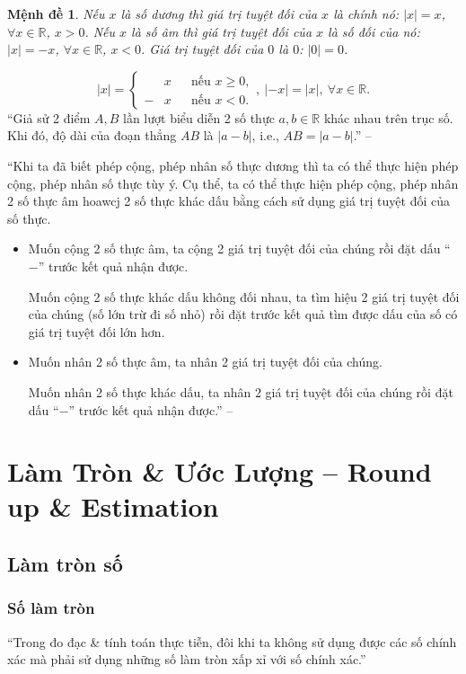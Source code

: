 \documentclass[oneside]{book}
\numberwithin{equation}{section}
\newtheorem{menhde}{Mệnh đề}[section]
\begin{document}
\begin{menhde}
	Nếu $x$ là số dương thì giá trị tuyệt đối của $x$ là chính nó: $|x| = x$, $\forall x\in\mathbb{R}$, $x > 0$. Nếu $x$ là số âm thì giá trị tuyệt đối của $x$ là số đối của nó: $|x| = -x$, $\forall x\in\mathbb{R}$, $x < 0$. Giá trị tuyệt đối của $0$ là $0$: $|0| = 0$.
\end{menhde}
\begin{equation*}
	|x| = \left\{\begin{split}
		&x&&\mbox{nếu } x\ge 0,\\
		-&x&&\mbox{nếu } x < 0.
	\end{split}\right.,\ |-x| = |x|,\ \forall x\in\mathbb{R}.
\end{equation*}
``Giả sử 2 điểm $A,B$ lần lượt biểu diễn 2 số thực $a,b\in\mathbb{R}$ khác nhau trên trục số. Khi đó, độ dài của đoạn thẳng $AB$ là $|a - b|$, i.e., $AB = |a - b|$.'' -- \cite[p. 46]{SGK_Toan_7_Canh_Dieu_tap_1}

``Khi ta đã biết phép cộng, phép nhân số thực dương thì ta có thể thực hiện phép cộng, phép nhân số thực tùy ý. Cụ thể, ta có thể thực hiện phép cộng, phép nhân 2 số thực âm hoawcj 2 số thực khác dấu bằng cách sử dụng giá trị tuyệt đối của số thực.
\begin{itemize}
	\item Muốn cộng 2 số thực âm, ta cộng 2 giá trị tuyệt đối của chúng rồi đặt dấu ``$-$'' trước kết quả nhận được.
	
	Muốn cộng 2 số thực khác dấu không đối nhau, ta tìm hiệu 2 giá trị tuyệt đối của chúng (số lớn trừ đi số nhỏ) rồi đặt trước kết quả tìm được dấu của số có giá trị tuyệt đối lớn hơn.
	\item Muốn nhân 2 số thực âm, ta nhân 2 giá trị tuyệt đối của chúng.
	
	Muốn nhân 2 số thực khác dấu, ta nhân 2 giá trị tuyệt đối của chúng rồi đặt dấu ``$-$'' trước kết quả nhận được.'' -- \cite[p. 47]{SGK_Toan_7_Canh_Dieu_tap_1}
\end{itemize}

\section{Làm Tròn \& Ước Lượng -- Round up \& Estimation}

\subsection{Làm tròn số}

\subsubsection{Số làm tròn}
``Trong đo đạc \& tính toán thực tiễn, đôi khi ta không sử dụng được các số chính xác mà phải sử dụng những số làm tròn xấp xỉ với số chính xác.''
\end{document}
